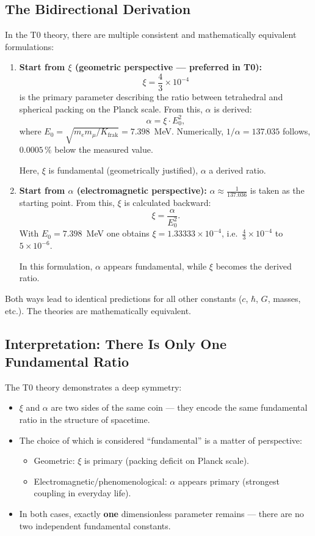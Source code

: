 	\subsection{The Bidirectional Derivation}
	In the T0 theory, there are multiple consistent and mathematically equivalent formulations:
	\begin{enumerate}
		\item \textbf{Start from $\xi$ (geometric perspective --- preferred in T0):}
		\[
		\xi = \frac{4}{3} \times 10^{-4}
		\]
		is the primary parameter describing the ratio between tetrahedral and spherical packing on the Planck scale. From this, $\alpha$ is derived:
		\[
		\alpha = \xi \cdot E_0^2 ,
		\]
		where $E_0 = \sqrt{m_e m_\mu/K_{\text{frak}}} = 7.398$~MeV. Numerically, $1/\alpha = 137.035$ follows, $0.0005\,\%$ below the measured value.
		
		Here, $\xi$ is fundamental (geometrically justified), $\alpha$ a derived ratio.
		
		\item \textbf{Start from $\alpha$ (electromagnetic perspective):}
		$\alpha \approx \frac{1}{137.036}$
		is taken as the starting point. From this, $\xi$ is calculated backward:
		\[
		\xi = \frac{\alpha}{E_0^2} .
		\]
		With $E_0 = 7.398$~MeV one obtains $\xi = 1.33333\times10^{-4}$, i.e.\ $\frac{4}{3} \times 10^{-4}$ to $5\times10^{-6}$.
		
		In this formulation, $\alpha$ appears fundamental, while $\xi$ becomes the derived ratio.
	\end{enumerate}
	
	Both ways lead to identical predictions for all other constants ($c$, $\hbar$, $G$, masses, etc.). The theories are mathematically equivalent.
	
	\subsection{Interpretation: There Is Only One Fundamental Ratio}
	The T0 theory demonstrates a deep symmetry:
	\begin{itemize}
		\item $\xi$ and $\alpha$ are two sides of the same coin --- they encode the same fundamental ratio in the structure of spacetime.
		\item The choice of which is considered ``fundamental'' is a matter of perspective:
		\begin{itemize}
			\item Geometric: $\xi$ is primary (packing deficit on Planck scale).
			\item Electromagnetic/phenomenological: $\alpha$ appears primary (strongest coupling in everyday life).
		\end{itemize}
		\item In both cases, exactly \textbf{one} dimensionless parameter remains --- there are no two independent fundamental constants.
	\end{itemize}
	

